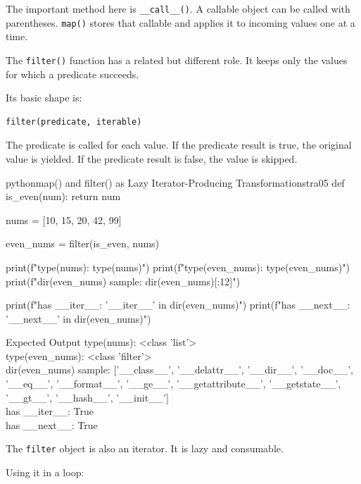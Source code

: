 \documentclass[a4paper,twoside]{report}
\begin{document}
The important method here is \texttt{\_\_call\_\_()}. A callable object can be called with parentheses. \texttt{map()} stores that callable and applies it to incoming values one at a time.

The \texttt{filter()} function has a related but different role. It keeps only the values for which a predicate succeeds.

Its basic shape is:

\begin{verbatim}
filter(predicate, iterable)
\end{verbatim}

The predicate is called for each value. If the predicate result is true, the original value is yielded. If the predicate result is false, the value is skipped.

\begin{codebox}[]{python}{map() and filter() as Lazy Iterator-Producing Transformations}{tra05}
def is_even(num):
    return num %

nums = [10, 15, 20, 42, 99]

even_nums = filter(is_even, nums)

print(f"type(nums): {type(nums)}")
print(f"type(even_nums): {type(even_nums)}")
print(f"dir(even_nums) sample: {dir(even_nums)[:12]}")

print(f"has __iter__: {'__iter__' in dir(even_nums)}")
print(f"has __next__: {'__next__' in dir(even_nums)}")
\end{codebox}


\begin{iobox}{Expected Output}
type(nums): <class 'list'> \\
type(even\_nums): <class 'filter'> \\
dir(even\_nums) sample: ['\_\_class\_\_', '\_\_delattr\_\_', '\_\_dir\_\_', '\_\_doc\_\_', \\
'\_\_eq\_\_', '\_\_format\_\_', '\_\_ge\_\_', '\_\_getattribute\_\_', '\_\_getstate\_\_', \\
'\_\_gt\_\_', '\_\_hash\_\_', '\_\_init\_\_'] \\
has \_\_iter\_\_: True \\
has \_\_next\_\_: True \\
\end{iobox}




The \texttt{filter} object is also an iterator. It is lazy and consumable.

Using it in a loop:
\end{document}
